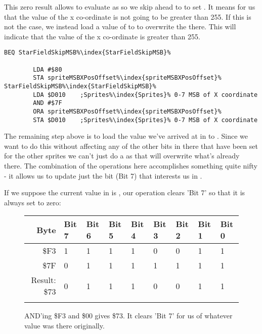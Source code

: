 This zero result allows  to evaluate as  so we skip ahead to 
to set .
It means for us that the value of the x co-ordinate is not going to be greater than 255. If this is not the case, we instead load a value of
 to  to overwrite the  there. This will indicate that the value of the x co-ordinate
is greater than 255.

\begin{lstlisting}[basicstyle=\tiny,escapechar=\%]
        BEQ StarFieldSkipMSB%\index{StarFieldSkipMSB}%

        LDA #$80
        STA spriteMSBXPosOffset%\index{spriteMSBXPosOffset}%
StarFieldSkipMSB%\index{StarFieldSkipMSB}%   
        LDA $D010    ;Sprites%\index{Sprites}% 0-7 MSB of X coordinate
        AND #$7F
        ORA spriteMSBXPosOffset%\index{spriteMSBXPosOffset}%
        STA $D010    ;Sprites%\index{Sprites}% 0-7 MSB of X coordinate
\end{lstlisting}

The remaining step above is to load the value we've arrived at in  to . Since we
want to do this without affecting any of the other bits in there that have been set for the other sprites we can't
just do a  as that will overwrite what's already there. The combination of the  operations
here accomplishes something quite nifty - it allows us to update just the bit (Bit 7) that interests us in .

If we suppose the current value in  is , our  operation clears 'Bit 7' so that
it is always set to zero:

\begin{figure}[H]
  {
    \setlength{\tabcolsep}{3.0pt}
    \setlength\cmidrulewidth{\heavyrulewidth} %
    \begin{adjustbox}{width=10cm,center}

      \begin{tabular}{rllllllll}
        \toprule
        Byte & Bit 7 & Bit 6 & Bit 5 & Bit 4 & Bit 3 & Bit 2 & Bit 1 & Bit 0        \\
        \midrule
        \$F3 & 1 & 1 & 1 & 1 & 0 & 0 & 1 & 1 \\
        \$7F & 0 & 1 & 1 & 1 & 1 & 1 & 1 & 1 \\
        \midrule
        Result: \$73 & 0 & 1 & 1 & 1 & 0 & 0 & 1 & 1 \\
        \addlinespace
        \bottomrule
      \end{tabular}
    \end{adjustbox}
  }\caption*{AND'ing \$F3 and \$00 gives \$73. It clears 'Bit 7' for us of whatever value was there originally.}
\end{figure}

